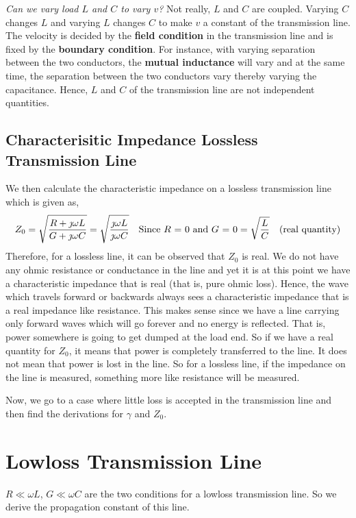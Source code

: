 \emph{Can we vary load $L$ and $C$ to vary $v$?} Not really, $L$ and $C$ are coupled. Varying $C$ changes $L$ and varying $L$ changes $C$ to make $v$ a constant of the transmission line. The velocity is decided by the \textbf{field condition} in the transmission line and is fixed by the \textbf{boundary condition}. For instance, with varying separation between the two conductors, the \textbf{mutual inductance} will vary and at the same time, the separation between the two conductors vary thereby varying the capacitance. Hence, $L$ and $C$ of the transmission line are not independent quantities.

\subsection{Characterisitic Impedance Lossless Transmission Line}
We then calculate the characteristic impedance on a lossless transmission line which is given as,
\begin{dmath*}
Z_0 = \sqrt{\frac{R + \jmath\omega L}{G + \jmath\omega C}}
= \sqrt{\frac{\jmath\omega L}{\jmath\omega C}}\quad\text{Since }R\text{ = }0\text{ and }G\text{ = }0
= \sqrt{\frac{L}{C}} \quad\textnormal{(real quantity)}
\end{dmath*}
Therefore, for a lossless line, it can be observed that $Z_0$ is real. We do not have any ohmic resistance or conductance in the line and yet it is at this point we have a characteristic impedance that is real (that is, pure ohmic loss). Hence, the wave which travels forward or backwards always sees a characteristic impedance that is a real impedance like resistance. This makes sense since we have a line carrying only forward waves which will go forever and no energy is reflected. That is, power somewhere is going to get dumped at the load end. So if we have a real quantity for $Z_0$, it means that power is completely transferred to the line. It does not mean that power is lost in the line. So for a lossless line, if the impedance on the line is measured, something more like resistance will be measured.

Now, we go to a case where little loss is accepted in the transmission line and then find the derivations for $\gamma$ and $Z_0$.

\section{Lowloss Transmission Line}
$R\ll\omega L$, $G\ll\omega C$ are the two conditions for a lowloss transmission line. So we derive the propagation constant of this line.

